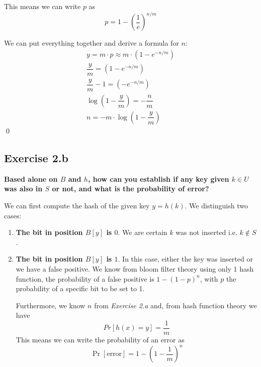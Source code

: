 \documentclass{article}
\begin{document}
This means we can write \(p\) as
\[p = 1-\left(\dfrac{1}{e}\right)^{{n}/{m}}\]

We can put everything together and derive a formula for \(n\):
\begin{gather*}
	y = m \cdot p \approx m \cdot \left( 1-e^{-n/m} \right) \\
	\dfrac{y}{m} = \left( 1-e^{-n/m} \right) \\
	\dfrac{y}{m} -1 = \left( -e^{-n/m} \right) \\
	\log\left(1 - \dfrac{y}{m}\right) = -\dfrac{n}{m} \\
	n = -m \cdot \log\left( 1 - \dfrac{y}{m} \right)
\end{gather*}\qed

\pagebreak
\subsection*{Exercise 2.b}
\textbf{Based alone on \(B\) and \(h\), how can you establish if any key given \(k \in U\) was also in \(S\) or not,
and what is the probability of error?}

We can first compute the hash of the given key \(y = h(k)\). We distinguish two cases:
\begin{enumerate}
	\item \textbf{The bit in position \(B[y]\) is \(0\)}. We are certain \(k\) was not inserted i.e. \(k \notin S\).
	\item \textbf{The bit in position \(B[y]\) is \(1\)}. In this case, either the key was inserted or we have a false positive.
	We know from bloom filter theory using only 1 hash function, the probability of a false positive is \(1 - (1 - p)^n\), with
	\(p\) the probability of a specific bit to be set to 1.

	Furthermore, we know \(n\) from \textit{Exercise 2.a} and, from hash function theory we have
	\[Pr[h(x) = y] = \dfrac{1}{m}\]
	This means we can write the probability of an error as
	\[ \Pr\left[\text{error}\right] = 1-\left(1-\dfrac{1}{m}\right)^{n} \]
\end{enumerate}
\end{document}
